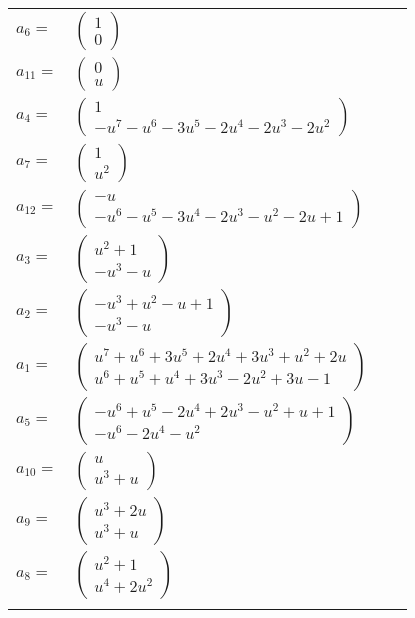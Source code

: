 \documentclass[1p]{elsarticle_modified}
\theoremstyle{definition}
\begin{document}
\begin{tabular}{m{7pt} m{180pt} m{7pt} m{180pt} }
\flushright $a_{6}=$&$\begin{pmatrix}1\\0\end{pmatrix}$ \\
\flushright $a_{11}=$&$\begin{pmatrix}0\\u\end{pmatrix}$ \\
\flushright $a_{4}=$&$\begin{pmatrix}1\\- u^7- u^6-3 u^5-2 u^4-2 u^3-2 u^2\end{pmatrix}$ \\
\flushright $a_{7}=$&$\begin{pmatrix}1\\u^2\end{pmatrix}$ \\
\flushright $a_{12}=$&$\begin{pmatrix}- u\\- u^6- u^5-3 u^4-2 u^3- u^2-2 u+1\end{pmatrix}$ \\
\flushright $a_{3}=$&$\begin{pmatrix}u^2+1\\- u^3- u\end{pmatrix}$ \\
\flushright $a_{2}=$&$\begin{pmatrix}- u^3+u^2- u+1\\- u^3- u\end{pmatrix}$ \\
\flushright $a_{1}=$&$\begin{pmatrix}u^7+u^6+3 u^5+2 u^4+3 u^3+u^2+2 u\\u^6+u^5+u^4+3 u^3-2 u^2+3 u-1\end{pmatrix}$ \\
\flushright $a_{5}=$&$\begin{pmatrix}- u^6+u^5-2 u^4+2 u^3- u^2+u+1\\- u^6-2 u^4- u^2\end{pmatrix}$ \\
\flushright $a_{10}=$&$\begin{pmatrix}u\\u^3+u\end{pmatrix}$ \\
\flushright $a_{9}=$&$\begin{pmatrix}u^3+2 u\\u^3+u\end{pmatrix}$ \\
\flushright $a_{8}=$&$\begin{pmatrix}u^2+1\\u^4+2 u^2\end{pmatrix}$\\&\end{tabular}
\end{document}
